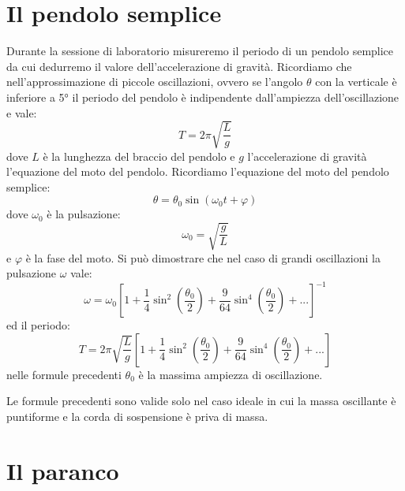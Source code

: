 \documentclass[a4paper,10pt,oneside]{article}
\begin{document}
\section{Il pendolo semplice}
Durante la sessione di laboratorio misureremo il periodo di un pendolo semplice da cui dedurremo il valore dell'accelerazione di gravità. Ricordiamo che nell'approssimazione di piccole oscillazioni, ovvero se l'angolo $\theta$ con la verticale è inferiore a 5° il periodo del pendolo è indipendente dall'ampiezza dell'oscillazione e vale:
\begin{equation}
 T=2\pi\sqrt{\frac{L}{g}}
\end{equation}
dove $L$ è la lunghezza del braccio del pendolo e $g$ l'accelerazione di gravità l'equazione del moto del pendolo. Ricordiamo l'equazione del moto del pendolo semplice:
\begin{equation}
 \theta=\theta_0\sin(\omega_0 t+\varphi)
\end{equation}
dove $\omega_0$ è la pulsazione:
\begin{equation}
 \omega_0=\sqrt{\frac{g}{L}}
\end{equation}
e $\varphi$ è la fase del moto. Si può dimostrare che nel caso di grandi oscillazioni la pulsazione $\omega$ vale:
\begin{equation}
 \omega=\omega_0\left[1+\frac 1 4 \sin^2\left( \frac{\theta_0}{2}\right)+\frac{9}{64}\sin^4\left( \frac{\theta_0}{2}\right)+...  \right]^{-1}
\end{equation}
ed il periodo:
\begin{equation}
T=2\pi\sqrt{\frac{L}{g}}\left[1+\frac 1 4 \sin^2\left( \frac{\theta_0}{2}\right)+\frac{9}{64}\sin^4\left( \frac{\theta_0}{2}\right)+...  \right]
\end{equation}
nelle formule precedenti $\theta_0$ è la massima ampiezza di oscillazione.

Le formule precedenti sono valide solo nel caso ideale in cui la massa oscillante è puntiforme e la corda di sospensione è priva di massa.


\section{Il paranco}
\end{document}

